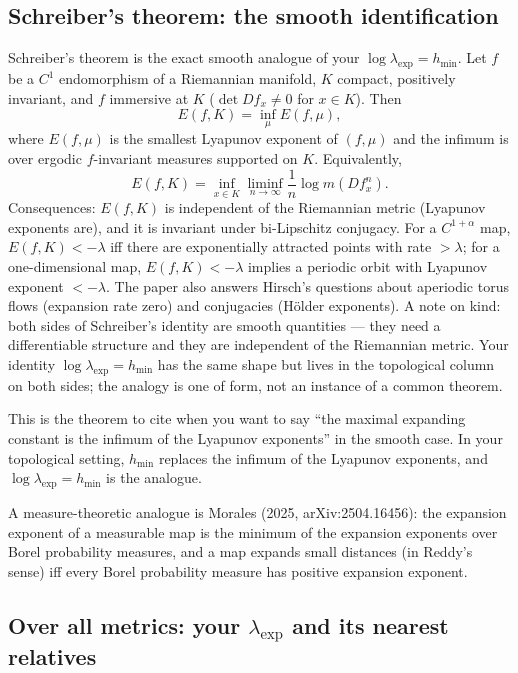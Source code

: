 \documentclass[
]{article}
\begin{document}
\subsection{Schreiber's theorem: the smooth
identification}\label{schreibers-theorem-the-smooth-identification}

Schreiber's theorem is the exact smooth analogue of your
\(\log\lambda_{\exp}=h_{\min}\). Let \(f\) be a \(C^1\) endomorphism of
a Riemannian manifold, \(K\) compact, positively invariant, and \(f\)
immersive at \(K\) (\(\det Df_x\ne0\) for \(x\in K\)). Then \[
E(f,K)=\inf_\mu E(f,\mu),
\] where \(E(f,\mu)\) is the smallest Lyapunov exponent of \((f,\mu)\)
and the infimum is over ergodic \(f\)-invariant measures supported on
\(K\). Equivalently, \[
E(f,K)=\inf_{x\in K}\liminf_{n\to\infty}\frac1n\log m(Df^n_x).
\] Consequences: \(E(f,K)\) is independent of the Riemannian metric
(Lyapunov exponents are), and it is invariant under bi-Lipschitz
conjugacy. For a \(C^{1+\alpha}\) map, \(E(f,K)<-\lambda\) iff there are
exponentially attracted points with rate \(>\lambda\); for a
one-dimensional map, \(E(f,K)<-\lambda\) implies a periodic orbit with
Lyapunov exponent \(<-\lambda\). The paper also answers Hirsch's
questions about aperiodic torus flows (expansion rate zero) and
conjugacies (H\"{o}lder exponents). A note on kind: both sides of
Schreiber's identity are smooth quantities --- they need a
differentiable structure and they are independent of the Riemannian
metric. Your identity \(\log\lambda_{\exp}=h_{\min}\) has the same shape
but lives in the topological column on both sides; the analogy is one of
form, not an instance of a common theorem.

This is the theorem to cite when you want to say ``the maximal expanding
constant is the infimum of the Lyapunov exponents'' in the smooth case.
In your topological setting, \(h_{\min}\) replaces the infimum of the
Lyapunov exponents, and \(\log\lambda_{\exp}=h_{\min}\) is the analogue.

A measure-theoretic analogue is Morales (2025, arXiv:2504.16456): the
expansion exponent of a measurable map is the minimum of the expansion
exponents over Borel probability measures, and a map expands small
distances (in Reddy's sense) iff every Borel probability measure has
positive expansion exponent.

\subsection{\texorpdfstring{Over all metrics: your \(\lambda_{\exp}\)
and its nearest
relatives}{Over all metrics: your \textbackslash lambda\_\{\textbackslash exp\} and its nearest relatives}}\label{over-all-metrics-your-lambda_exp-and-its-nearest-relatives}
\end{document}
